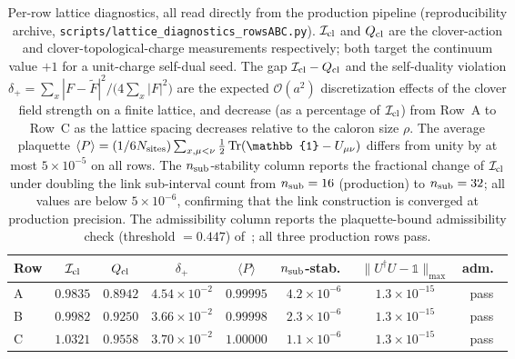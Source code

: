 \documentclass[a4paper,11pt]{article}
\theoremstyle{definition}
\newcommand{\Tr}{\mathop{\rm Tr}}
\newcommand{\Icl}{\mathcal{I}_{\rm cl}}
\begin{document}
\begin{table}[h]
\centering
\begin{tabular}{lccccccc}
\toprule
Row & $\Icl$ & $Q_{\rm cl}$ & $\delta_+$ & $\langle P\rangle$ & $n_{\rm sub}$-stab.\ & $\|U^\dagger U{-}\mathbb{1}\|_{\max}$ & adm.\ \\
\midrule
A & $0.9835$ & $0.8942$ & $4.54\times 10^{-2}$ & $0.99995$ & $4.2\times 10^{-6}$ & $1.3\times 10^{-15}$ & pass \\
B & $0.9982$ & $0.9250$ & $3.66\times 10^{-2}$ & $0.99998$ & $2.3\times 10^{-6}$ & $1.3\times 10^{-15}$ & pass \\
C & $1.0321$ & $0.9558$ & $3.70\times 10^{-2}$ & $1.00000$ & $1.1\times 10^{-6}$ & $1.3\times 10^{-15}$ & pass \\
\bottomrule
\end{tabular}
\caption{Per-row lattice diagnostics, all read directly from the
production pipeline (reproducibility archive,
\texttt{scripts/lattice\_diagnostics\_rowsABC.py}). $\Icl$ and
$Q_{\rm cl}$ are the clover-action and clover-topological-charge
measurements respectively; both target the continuum value $+1$ for
a unit-charge self-dual seed. The gap $\Icl - Q_{\rm cl}$ and the
self-duality violation
$\delta_+ = \sum_x |F - \tilde F|^2 / \bigl(4\sum_x |F|^2\bigr)$ are
the expected $\mathcal{O}(a^2)$ discretization effects of the clover
field strength on a finite lattice, and decrease (as a percentage of
$\Icl$) from Row~A to Row~C as the lattice spacing decreases
relative to the caloron size $\rho$. The average plaquette
$\langle P\rangle = (1/6 N_{\rm sites})\sum_{x,\mu<\nu}
\tfrac{1}{2}\Tr(\mathbb{1} - U_{\mu\nu})$ differs from unity by at
most $5\times 10^{-5}$ on all rows. The $n_{\rm sub}$-stability
column reports the fractional change of $\Icl$ under doubling the
link sub-interval count from $n_{\rm sub} = 16$ (production) to
$n_{\rm sub} = 32$; all values are below $5\times 10^{-6}$,
confirming that the link construction is converged at production
precision. The admissibility column reports the plaquette-bound
admissibility check (threshold $= 0.447$) of~\cite{Luscher-admissibility};
all three production rows pass.}
\label{tab:lattice-diagnostics}
\end{table}
\end{document}
